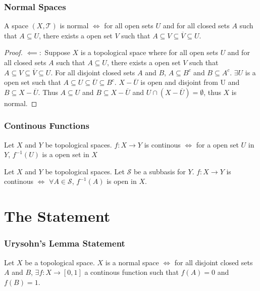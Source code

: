 \documentclass{beamer}
\newcommand*{\T}{\mathcal{T}}
\newcommand*{\subeq}{\subseteq}
\newcommand*{\empset}{\emptyset}
\begin{document}
\begin{frame}
    \frametitle{Normal Spaces}

    \begin{Theorem}
        A space $(X, \T)$ is normal $\iff$ for all open sets $U$ and for all closed sets $A$ such that $A \subeq U$, there exists a open set $V$ such that $A \subeq V \subeq \overline{V} \subeq U$.
    \end{Theorem}

    \begin{proof}
        $\impliedby:$ Suppose $X$ is a topological space where for all open sets $U$ and for all closed sets $A$ such that $A \subeq U$, there exists a open set $V$ such that $A \subeq V \subeq \overline{V} \subeq U$. For all disjoint closed sets $A$ and $B$, $A \subeq B^c$ and $B \subeq A^c$. $\exists U$ is a open set such that $A \subeq U \subeq \overline{U} \subeq B^c$. $X - \overline{U}$ is open and disjoint from U and $B \subeq X - \overline{U}$. Thus $A \subeq U$ and $B \subeq X - \overline{U}$ and $U \cap (X - \overline{U}) = \empset$, thus $X$ is normal.                 
    \end{proof}

\end{frame}

\begin{frame}
    \frametitle{Continous Functions}

    \begin{definition}
        Let $X$ and $Y$ be topological spaces. $f: X \to Y$ is continous $\iff$ for a open set $U$ in $Y$, $f^{-1}(U)$ is a open set in $X$        
    \end{definition}

    \begin{Theorem}
        Let $X$ and $Y$ be topological spaces. Let $\mathcal{S}$ be a subbasis for $Y$. $f: X \to Y$ is continous $\iff$ $\forall A \in \mathcal{S}$, $f^{-1}(A)$ is open in $X$.        
    \end{Theorem}

\end{frame}

\section{The Statement}
\begin{frame}
    \frametitle{Urysohn's Lemma Statement}

    \begin{Theorem}
        Let $X$ be a topological space. $X$ is a normal space $\iff$ for all disjoint closed sets $A$ and $B$, $\exists f: X \to [0, 1]$ a continous function such that $f(A) = 0$ and $f(B) = 1$.         
    \end{Theorem}

\end{frame}
\end{document}
